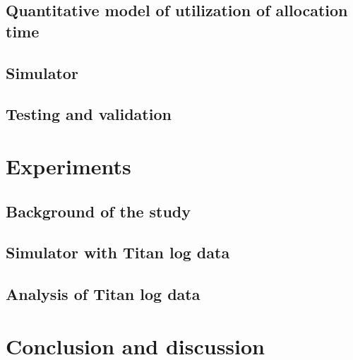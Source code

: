 \documentclass[twocolumn]{svjour3}           %
\begin{document}
\subsection{Quantitative model of utilization of allocation time}
\label{sec-strategy-2}


\subsection{Simulator}
\label{sec-strategy-3}


\subsection{Testing and validation}
\label{sec-strategy-4}



\section{Experiments}
\label{sec-experiments}

\subsection{Background of the study}
\label{sec-experiments-1}


\subsection{Simulator with Titan log data}
\label{sec-experiments-2}


\subsection{Analysis of Titan log data}
\label{sec-experiments-3}



\section{Conclusion and discussion}
\label{sec-conclusions}



\begin{acknowledgements}

\end{acknowledgements}



\begin{thebibliography}{}

\end{thebibliography}

\clearpage
\appendix

\end{document}
